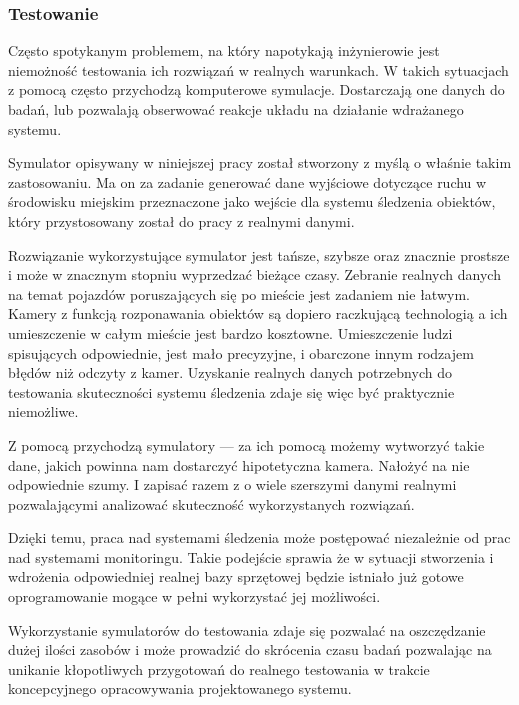 \subsubsection{Testowanie}
\par{
Często spotykanym problemem, na który napotykają inżynierowie jest niemożność testowania ich rozwiązań w realnych warunkach. W takich sytuacjach z pomocą często przychodzą komputerowe symulacje. Dostarczają one danych do badań, lub pozwalają obserwować reakcje układu na działanie wdrażanego systemu.
}
\par{
Symulator opisywany w niniejszej pracy został stworzony z myślą o właśnie takim zastosowaniu. Ma on za zadanie generować dane wyjściowe dotyczące ruchu w środowisku miejskim przeznaczone jako wejście dla systemu śledzenia obiektów, który przystosowany został do pracy z realnymi danymi.
}
\par{
Rozwiązanie wykorzystujące symulator jest tańsze, szybsze oraz znacznie prostsze i może w znacznym stopniu wyprzedzać bieżące czasy.
Zebranie realnych danych na temat pojazdów poruszających się po mieście jest zadaniem nie łatwym. Kamery z funkcją rozponawania obiektów są dopiero raczkującą technologią a ich umieszczenie w całym mieście jest bardzo kosztowne. Umieszczenie ludzi spisujących odpowiednie, jest mało precyzyjne, i obarczone innym rodzajem błędów niż odczyty z kamer. Uzyskanie realnych danych potrzebnych do testowania skuteczności systemu śledzenia zdaje się więc być praktycznie niemożliwe.
}
\par{
Z pomocą przychodzą symulatory --- za ich pomocą możemy wytworzyć takie dane, jakich powinna nam dostarczyć hipotetyczna kamera. Nałożyć na nie odpowiednie szumy. I zapisać razem z o wiele szerszymi danymi realnymi pozwalającymi analizować skuteczność wykorzystanych rozwiązań.
}
\par{
Dzięki temu, praca nad systemami śledzenia może postępować niezależnie od prac nad systemami monitoringu. Takie podejście sprawia że w sytuacji stworzenia i wdrożenia odpowiedniej realnej bazy sprzętowej będzie istniało już gotowe oprogramowanie mogące w pełni wykorzystać jej możliwości.
}
\par{
Wykorzystanie symulatorów do testowania zdaje się pozwalać na oszczędzanie dużej ilości zasobów i może prowadzić do skrócenia czasu badań pozwalając na unikanie kłopotliwych przygotowań do realnego testowania w trakcie koncepcyjnego opracowywania projektowanego systemu.
}

